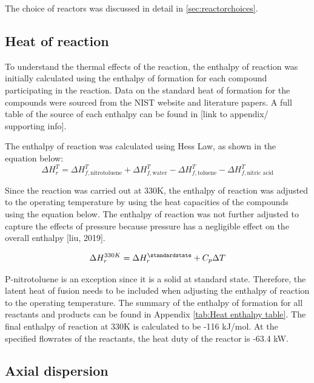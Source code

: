 The choice of reactors was discussed in detail in \cref{sec:reactorchoices}.

\subsection{Heat of reaction}
To understand the thermal effects of the reaction, the enthalpy of reaction was initially calculated using the enthalpy of formation for each compound participating in the reaction. Data on the standard heat of formation for the compounds were sourced from the NIST website and literature papers. A full table of the source of each enthalpy can be found in [link to appendix/ supporting info]. 

The enthalpy of reaction was calculated using Hess Law, as shown in the equation below:
\begin{equation}
    \Delta H_{r}^{T} = \Delta H_{f,\mathrm{nitrotoluene}}^{T} + \Delta H_{f,\mathrm{water}}^{T} - \Delta H_{f,\mathrm{toluene}}^{T} - \Delta H_{f,\text{nitric acid}}^{T}
\end{equation}

Since the reaction was carried out at 330K, the enthalpy of reaction was adjusted to the operating temperature by using the heat capacities of the compounds using the equation below. The enthalpy of reaction was not further adjusted to capture the effects of pressure because pressure has a negligible effect on the overall enthalpy [liu, 2019]. 

\begin{equation}
    \Delta H_{r}^{330K} = \Delta H_{r}^{\standardstate} + C_p \Delta T
\end{equation}

P-nitrotoluene is an exception since it is a solid at standard state. Therefore, the latent heat of fusion needs to be included when adjusting the enthalpy of reaction to the operating temperature. The summary of the enthalpy of formation for all reactants and products can be found in Appendix \ref{tab:Heat enthalpy table}. The final enthalpy of reaction at 330K is calculated to be -116 kJ/mol. At the specified flowrates of the reactants, the heat duty of the reactor is -63.4 kW.

\subsection{Axial dispersion}
\label{sec:axialdispersion}

